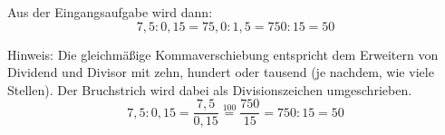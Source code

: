 Aus der Eingangsaufgabe wird dann:
$$ 7{,}5:0{,}15=75{,}0:1{,}5=750:15=50$$

Hinweis: Die gleichmäßige Kommaverschiebung entspricht dem Erweitern von Dividend und Divisor mit zehn, hundert oder tausend (je nachdem, wie viele Stellen). Der Bruchstrich wird dabei als Divisionszeichen umgeschrieben.
$$ 7{,}5:0{,}15=\frac{7{,}5}{0{,}15}\overset{100}{=}\frac{750}{15}=750:15=50$$ 